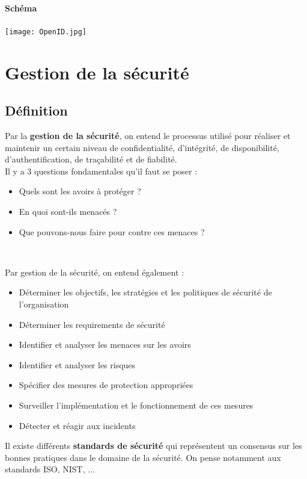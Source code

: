 \documentclass{report}
\begin{document}
\subsubsection{Schéma}

\texttt{[image: OpenID.jpg]}

\chapter{Gestion de la sécurité}

\section{Définition}

Par la \textbf{gestion de la sécurité}, on entend le processus utilisé pour réaliser et maintenir un certain niveau de confidentialité, d'intégrité, de disponibilité, d'authentification, de traçabilité et de fiabilité.\\

Il y a 3 questions fondamentales qu'il faut se poser :
\begin{itemize}
    \item Quels sont les avoirs à protéger ?
    \item En quoi sont-ils menacés ?
    \item Que pouvons-nous faire pour contre ces menaces ?
\end{itemize}~

Par gestion de la sécurité, on entend également :
\begin{itemize}
    \item Déterminer les objectifs, les stratégies et les politiques de sécurité de l'organisation
    \item Déterminer les requirements de sécurité
    \item Identifier et analyser les menaces sur les avoirs
    \item Identifier et analyser les risques
    \item Spécifier des mesures de protection appropriées
    \item Surveiller l'implémentation et le fonctionnement de ces mesures
    \item Détecter et réagir aux incidents
\end{itemize}

Il existe différents \textbf{standards de sécurité} qui représentent un consensus sur les bonnes pratiques dans le domaine de la sécurité. On pense notamment aux standards ISO, NIST, ...\\
\end{document}
